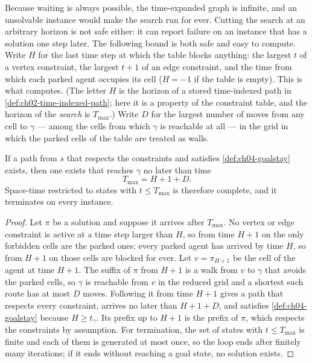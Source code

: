 Because waiting is always possible, the time-expanded graph is infinite, and an
unsolvable instance would make the search run for ever. Cutting the search at an
arbitrary horizon is not safe either: it can report failure on an instance that
has a solution one step later. The following bound is both safe and easy to
compute. Write $H$ for the last time step at which the table blocks anything:
the largest $t$ of a vertex constraint, the largest $t+1$ of an edge constraint,
and the time from which each parked agent occupies its cell ($H = -1$ if the
table is empty). This is what  computes. (The letter $H$
is the horizon of a stored time-indexed path in
\cref{def:ch02-time-indexed-path}; here it is a property of the constraint
table, and the horizon of the \emph{search} is $T_{\max}$.) Write
$D$ for the largest number of moves from any cell to $\gamma$ --- among the
cells from which $\gamma$ is reachable at all --- in the grid in which the
parked cells of the table are treated as walls.

\begin{proposition}
\label{thm:ch04-horizon}
If a path from $s$ that respects the constraints and satisfies
\cref{def:ch04-goalstay} exists, then one exists that reaches $\gamma$ no later
than time
\begin{equation}
  T_{\max} = H + 1 + D.
  \label{eq:ch04-horizon}
\end{equation}
Space-time \astar restricted to states with $t \le T_{\max}$ is therefore
complete, and it terminates on every instance.
\end{proposition}
\begin{proof}
Let $\pi$ be a solution and suppose it arrives after $T_{\max}$. No vertex or
edge constraint is active at a time step larger than $H$, so from time $H+1$ on
the only forbidden cells are the parked ones; every parked agent has arrived by
time $H$, so from $H+1$ on those cells are blocked for ever. Let
$v = \pi_{H+1}$ be the cell of the agent at time $H+1$. The suffix of $\pi$ from
$H+1$ is a walk from $v$ to $\gamma$ that avoids the parked cells, so $\gamma$ is
reachable from $v$ in the reduced grid and a shortest such route has at most $D$
moves. Following it from time $H+1$ gives a path that respects every constraint,
arrives no later than $H + 1 + D$, and satisfies \cref{def:ch04-goalstay}
because $H \ge t_\gamma$. Its prefix up to $H+1$ is the prefix of $\pi$, which
respects the constraints by assumption. For termination, the set of states with
$t \le T_{\max}$ is finite and each of them is generated at most once, so the
loop ends after finitely many iterations; if it ends without reaching a goal
state, no solution exists.
\end{proof}

